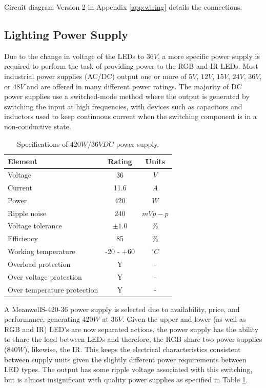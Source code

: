 \documentclass[fleqn,twoside,12pt]{report}
\begin{document}
Circuit diagram Version 2 in Appendix \ref{app:wiring} details the connections.


\subsection{Lighting Power Supply}

Due to the change in voltage of the LEDs to $36V$, a more specific power supply is required to perform the task of providing power to the RGB and IR LEDs. Most industrial power supplies (AC/DC) output one or more of $5V$, $12V$, $15V$, $24V$, $36V$, or $48V$ and are offered in many different power ratings. The majority of DC power supplies use a switched-mode method where the output is generated by switching the input at high frequencies, with devices such as capacitors and inductors used to keep continuous current when the switching component is in a non-conductive state. 

\begin{table}[h]
	\centering
	\caption{Specifications of $420W/36VDC$ power supply.}
	\label{tab:meanwell_specs}
	\begin{tabular}{lcc}
		\toprule
		\textbf{Element}  & \textbf{Rating} & \textbf{Units} \\[8pt]
		\midrule
		Voltage 					& 36 & $V$ \\[4pt]
		Current 					& 11.6 & $A$ \\[4pt]
		Power 						& 420 & $W$  \\[4pt]
		Ripple noise 				& 240 & $mVp-p$  \\[4pt]
		Voltage tolerance 			& $\pm1.0$ & $\%$  \\[4pt]
		Efficiency 					& 85 & $\%$ \\[4pt]
		Working temperature 		& -20 - +60 & $^{\circ}C$ \\[4pt]
		Overload protection 		& Y & - \\[4pt]
		Over voltage protection 	& Y & - \\[4pt]
		Over temperature protection & Y & - \\[4pt]
		\bottomrule
	\end{tabular}
\end{table}

A Meanwell\texttrademark S-420-36 power supply is selected due to availability, price, and performance, generating $420W$ at $36V$. Given the upper and lower (as well as RGB and IR) LED's are now separated actions, the power supply has the ability to share the load between LEDs and therefore, the RGB share two power supplies ($840W$), likewise, the IR. This keeps the electrical characteristics consistent between supply units given the slightly different power requirements between LED types. The output has some ripple voltage associated with this switching, but is almost insignificant with quality power supplies as specified in Table \ref{tab:meanwell_specs}.
\end{document}
